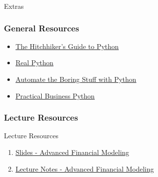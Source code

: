 \documentclass[handout, 11pt]{beamer}
\begin{document}
\begin{section}{Extras}
\begin{frame}
\frametitle{General Resources}
\begin{itemize}
\item \textcolor{blue}{\underline{\href{https://docs.python-guide.org/}{The Hitchhiker's Guide to Python}}}
\vfill
\item \textcolor{blue}{\underline{\href{https://realpython.com/}{Real Python}}}
\vfill
\item \textcolor{blue}{\underline{\href{https://automatetheboringstuff.com/}{Automate the Boring Stuff with Python}}}
\vfill
\item \textcolor{blue}{\underline{\href{https://pbpython.com/}{Practical Business Python}}}
\end{itemize}
\end{frame}
\end{section}
\appendix
{}
\setcounter{finalframe}{\value{framenumber}}
\begin{frame}
\frametitle{Lecture Resources}
{
\begin{block}{Lecture Resources}
\begin{enumerate}
\item \textcolor{blue}{\underline{\href{https://nickderobertis.github.io/fin-model-course/\_static/generated/pdfs/S13 Advanced Financial Modeling.pdf}{Slides - Advanced Financial Modeling}}}
\item \textcolor{blue}{\underline{\href{https://nickderobertis.github.io/fin-model-course/\_static/generated/pdfs/LN13 Advanced Financial Modeling.pdf}{Lecture Notes - Advanced Financial Modeling}}}
\end{enumerate}
\vfill
\end{block}
}
\label{frames:resources}
\end{frame}
\setcounter{framenumber}{\value{finalframe}}
\end{document}

